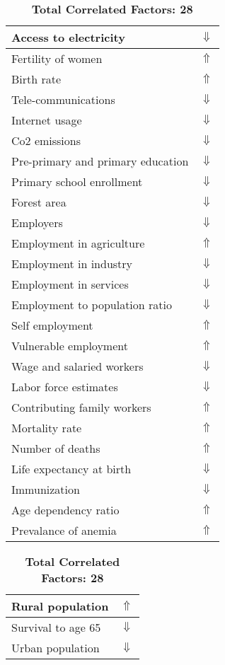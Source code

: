 \documentclass[12pt,notitlepage,oneside]{report}
\begin{document}
\begin{table}[!htb]
\caption{\textbf{Is Carried By: Sandfly $\Uparrow$}}
\centering
\label{Correlated Socio-economic Factors0}
\begin{tabular}{|l|l|}
\hline
Access to electricity & $\Downarrow$\\ \hline
Fertility of women & $\Uparrow$\\ \hline
Birth rate & $\Uparrow$\\ \hline
Tele-communications & $\Downarrow$\\ \hline
Internet usage & $\Downarrow$\\ \hline
Co2 emissions & $\Downarrow$\\ \hline
Pre-primary and primary education & $\Downarrow$\\ \hline
Primary school enrollment & $\Downarrow$\\ \hline
Forest area & $\Downarrow$\\ \hline
Employers & $\Downarrow$\\ \hline
Employment in agriculture & $\Uparrow$\\ \hline
Employment in industry & $\Downarrow$\\ \hline
Employment in services & $\Downarrow$\\ \hline
Employment to population ratio & $\Downarrow$\\ \hline
Self employment & $\Uparrow$\\ \hline
Vulnerable employment & $\Uparrow$\\ \hline
Wage and salaried workers & $\Downarrow$\\ \hline
Labor force estimates & $\Downarrow$\\ \hline
Contributing family workers & $\Uparrow$\\ \hline
Mortality rate & $\Uparrow$\\ \hline
Number of deaths & $\Uparrow$\\ \hline
Life expectancy at birth & $\Downarrow$\\ \hline
Immunization & $\Downarrow$\\ \hline
Age dependency ratio & $\Uparrow$\\ \hline
Prevalance of anemia & $\Uparrow$\\ \hline
\end{tabular}
\begin{tabular}{|l|l|}
\hline
Rural population & $\Uparrow$\\ \hline
Survival to age 65 & $\Downarrow$\\ \hline
Urban population & $\Downarrow$\\ \hline
\end{tabular}
\caption*{\textbf{Total Correlated Factors: 28}}
\end{table}
\end{document}

